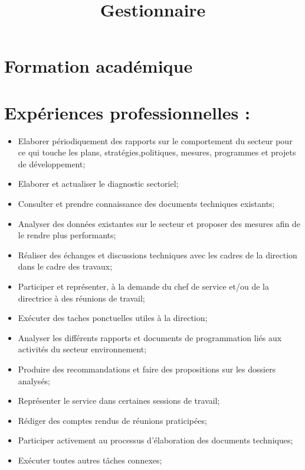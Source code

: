 \documentclass[10pt,a4paper,roman]{moderncv}
\title{Gestionnaire}
\begin{document}
\maketitle
\section{Formation acad\'{e}mique}
\section{Exp\'{e}riences professionnelles :}
{
	\begin{itemize}
		\item  Elaborer p\'{e}riodiquement des rapports sur le comportement du secteur pour ce qui touche les plans, strat\'{e}gies,politiques, mesures, programmes et projets de d\'{e}veloppement;
		\item Elaborer et actualiser le diagnostic sectoriel;
		\item Consulter et prendre connaissance des documents techniques existants;
		\item Analyser des donn\'{e}es existantes sur le secteur et proposer des mesures afin de le rendre plus performants;
		\item  R\'{e}aliser des \'{e}changes et discussions techniques avec les cadres de la direction dans le cadre des travaux;
		\item Participer et repr\'{e}senter, \`{a} la demande du chef de service et/ou de la directrice \`{a} des r\'{e}unions de travail;
		\item Ex\'{e}cuter des taches ponctuelles utiles \`{a} la direction;
	\end{itemize}
}
{
	\begin{itemize}
		\item  Analyser les diff\'{e}rents rapports et documents de programmation li\'{e}s aux activit\'{e}s du secteur environnement;
		\item Produire des recommandations et faire des propositions sur les dossiers analys\'{e}s;
		\item Repr\'{e}senter le service dans certaines sessions de travail;
		\item R\'{e}diger des comptes rendus de r\'{e}unions praticip\'{e}es;
		\item  Participer activement au processus d'\'{e}laboration des documents techniques;
		\item Ex\'{e}cuter toutes autres t\^{a}ches connexes;
	\end{itemize}
}
\end{document}
